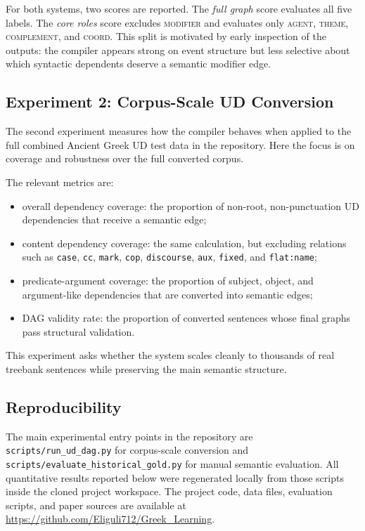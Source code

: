 \documentclass[11pt]{article}
\begin{document}
For both systems, two scores are reported. The \emph{full graph} score evaluates
all five labels. The \emph{core roles} score excludes \textsc{modifier} and
evaluates only \textsc{agent}, \textsc{theme}, \textsc{complement}, and
\textsc{coord}. This split is motivated by early inspection of the outputs: the
compiler appears strong on event structure but less selective about which
syntactic dependents deserve a semantic modifier edge.

\subsection{Experiment 2: Corpus-Scale UD Conversion}
The second experiment measures how the compiler behaves when applied to the full
combined Ancient Greek UD test data in the repository. Here the focus is on
coverage and robustness over the full converted corpus.

The relevant metrics are:
\begin{itemize}
  \item overall dependency coverage: the proportion of non-root,
  non-punctuation UD dependencies that receive a semantic edge;
  \item content dependency coverage: the same calculation, but excluding
  relations such as \texttt{case}, \texttt{cc}, \texttt{mark}, \texttt{cop},
  \texttt{discourse}, \texttt{aux}, \texttt{fixed}, and \texttt{flat:name};
  \item predicate-argument coverage: the proportion of subject, object, and
  argument-like dependencies that are converted into semantic edges;
  \item DAG validity rate: the proportion of converted sentences whose final
  graphs pass structural validation.
\end{itemize}

This experiment asks whether the system scales cleanly to thousands of real
treebank sentences while preserving the main semantic structure.

\subsection{Reproducibility}
The main experimental entry points in the repository are
\texttt{scripts/run\_ud\_dag.py} for corpus-scale conversion and
\texttt{scripts/evaluate\_historical\_gold.py} for manual semantic evaluation.
All quantitative results reported below were regenerated locally from those
scripts inside the cloned project workspace. The project code, data files,
evaluation scripts, and paper sources are available at
\url{https://github.com/Eliguli712/Greek_Learning}.
\end{document}
